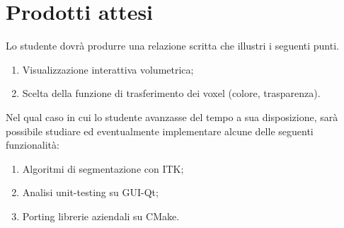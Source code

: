 \section*{Prodotti attesi}
Lo studente dovrà produrre una relazione scritta che illustri i seguenti punti.
\begin{enumerate}
    \item Visualizzazione interattiva volumetrica;
    
    \item Scelta della funzione di trasferimento dei voxel (colore, trasparenza).
\end{enumerate}

Nel qual caso in cui lo studente avanzasse del tempo a sua disposizione, sarà possibile studiare ed eventualmente implementare alcune delle seguenti funzionalità:
\begin{enumerate}
    \item Algoritmi di segmentazione con ITK;
    
    \item Analisi unit-testing su GUI-Qt;
    
    \item Porting librerie aziendali su CMake.
\end{enumerate}
